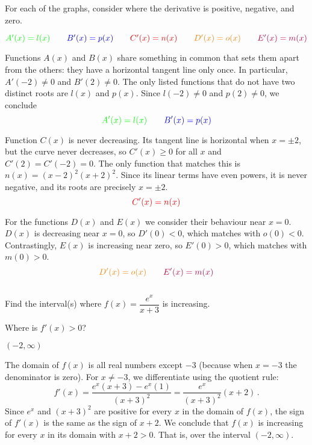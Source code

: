 \begin{hint}
For each of the graphs, consider where the derivative is positive, negative, and zero.
\end{hint}
\begin{answer}
$\textcolor{green}{A'(x)=l(x)} \qquad \textcolor{blue}{B'(x)=p(x)}
\qquad
\textcolor{red}{C'(x)=n(x)}
\qquad
\textcolor{orange}{D'(x)=o(x)}\qquad \textcolor{purple}{E'(x)=m(x)}$
\end{answer}
\begin{solution}
Functions $A(x)$ and $B(x)$ share something in common that sets them apart from the others: they have a horizontal tangent line only once. In particular, $A'(-2) \neq 0$ and $B'(2) \neq 0$. The only listed functions that do not have two distinct roots are $l(x)$ and $p(x)$. Since $l(-2) \neq 0$ and $p(2) \neq 0$, we conclude
\[\textcolor{green}{A'(x)=l(x)} \qquad \textcolor{blue}{B'(x)=p(x)}\]

Function $C(x)$ is never decreasing. Its tangent line is horizontal when $x = \pm 2$, but the curve never decreases, so $C'(x) \geq 0$ for all $x$ and $C'(2)=C'(-2)=0$. The only function that matches this is $n(x)=(x-2)^2(x+2)^2$. Since its linear terms have even powers, it is never negative, and its roots are precisely $x=\pm 2$.
\[\textcolor{red}{C'(x)=n(x)}\]

For the functions $D(x)$ and $E(x)$ we consider their behaviour
          near $x=0$.  $D(x)$ is decreasing near $x=0$, so $D'(0)<0$, which matches with $o(0)<0$. Contrastingly, $E(x)$ is increasing near zero, so
          $E'(0)>0$, which matches with $m(0)>0$.
\[\textcolor{orange}{D'(x)=o(x)}\qquad \textcolor{purple}{E'(x)=m(x)}\]
\end{solution}


\subsection*{\Procedural}


\begin{question}[2015Q]
Find the interval(s) where $f(x)=\dfrac{e^x}{x+3}$ is increasing.
\end{question}
\begin{hint}
Where is $f'(x)>0$?
\end{hint}
\begin{answer}
$(-2,\infty)$
\end{answer}
\begin{solution}
The domain of $f(x)$ is all real numbers except $-3$ (because when $x=-3$ the denominator is zero). For $x\neq -3$, we differentiate using the quotient rule:
$$f'(x)=\frac{e^x(x+3) - e^x(1)}{(x+3)^2} = \frac{e^x}{(x+3)^2} (x+2)\,.$$
Since $e^x$ and $(x+3)^2$ are  positive for every $x$ in the domain of $f(x)$, the sign of $f'(x)$ is the same as the sign of $x+2$. We conclude that $f(x)$
is increasing for every $x$ in its domain with $x+2>0$. That is, over the interval $(-2,\infty)$.
\end{solution}




